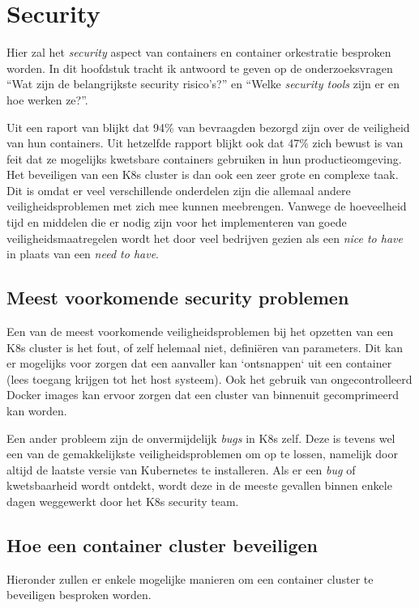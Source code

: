 \section{Security}

Hier zal het \textit{security} aspect van containers en container orkestratie besproken worden. In dit hoofdstuk tracht ik antwoord te geven op de onderzoeksvragen ``Wat zijn de belangrijkste security risico's?'' en ``Welke \textit{security tools} zijn er en hoe werken ze?''.

Uit een raport van \textcite{Tripwire2019} blijkt dat 94\% van bevraagden bezorgd zijn over de veiligheid van hun containers. Uit hetzelfde rapport blijkt ook dat 47\% zich bewust is van feit dat ze mogelijks kwetsbare containers gebruiken in hun productieomgeving. Het beveiligen van een K8s cluster is dan ook een zeer grote en complexe taak. Dit is omdat er veel verschillende onderdelen zijn die allemaal andere veiligheidsproblemen met zich mee kunnen meebrengen. Vanwege de hoeveelheid tijd en middelen die er nodig zijn voor het implementeren van goede veiligheidsmaatregelen wordt het door veel bedrijven gezien als een \textit{nice to have} in plaats van een \textit{need to have}.


\subsection{Meest voorkomende security problemen}
Een van de meest voorkomende veiligheidsproblemen bij het opzetten van een K8s cluster is het fout, of zelf helemaal niet, definiëren van parameters. Dit kan er mogelijks voor zorgen dat een aanvaller kan `ontsnappen` uit een container (lees toegang krijgen tot het host systeem). Ook het gebruik van ongecontrolleerd Docker images kan ervoor zorgen dat een cluster van binnenuit gecomprimeerd kan worden.

Een ander probleem zijn de onvermijdelijk \textit{bugs} in K8s zelf. Deze is tevens wel een van de gemakkelijkste veiligheidsproblemen om op te lossen, namelijk door altijd de laatste versie van Kubernetes te installeren. Als er een \textit{bug} of kwetsbaarheid wordt ontdekt, wordt deze in de meeste gevallen binnen enkele dagen weggewerkt door het K8s security team.

\subsection{Hoe een container cluster beveiligen}
Hieronder zullen er enkele mogelijke manieren om een container cluster te beveiligen besproken worden.

